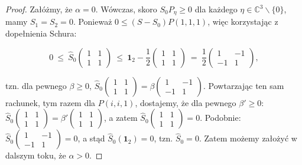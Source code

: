 {\begin{proof}
Załóżmy, że $\alpha = 0$.
Wówczas, skoro $S_{0} P_{\eta} \geq 0$ dla każdego
$\eta \in \mathbb{C}^{3}\backslash\{0\}$,
mamy $S_{1} = S_{2} = 0$.
Ponieważ
$0 \leq (S - S_{0}) P(1,1,1)$,
więc korzystając z dopełnienia Schura:
\begin{linenomath*}
 \begin{equation}
0 \: \leq \: \hat{S}_{0} \begin{pmatrix}
    1 & 1 \\ 1 & 1
    \end{pmatrix} \: \leq \:
    \mathbf{1}_{2} - \frac{1}{2} \begin{pmatrix}
                1 & 1 \\ 1 & 1
                \end{pmatrix} \: = \:
    \frac{1}{2}
    \begin{pmatrix}
    1 & -1 \\ -1 & 1
    \end{pmatrix},
 \end{equation}
\end{linenomath*}
tzn. dla pewnego $\beta \geq 0$,
$
\hat{S}_{0} \left( \begin{smallmatrix}
    1 & 1 \\ 1 & 1
    \end{smallmatrix} \right) =
    \beta \left(
    \begin{smallmatrix}
    1 & -1 \\ -1 & 1
    \end{smallmatrix} \right)
$.
Powtarzając ten sam rachunek, tym razem dla $P(i,i,1)$,
dostajemy, że dla pewnego $\beta' \geq 0$:
$
\hat{S}_{0} \left( \begin{smallmatrix}
    1 & 1 \\ 1 & 1
    \end{smallmatrix} \right) =
    \beta' \left(
    \begin{smallmatrix}
    1 & 1 \\ 1 & 1
    \end{smallmatrix} \right)
$,
a zatem
$
\hat{S}_{0} \left( \begin{smallmatrix}
    1 & 1 \\ 1 & 1
    \end{smallmatrix} \right) = 0
$.
Podobnie:
$
\hat{S}_{0} \left( \begin{smallmatrix}
    1 & -1 \\ -1 & 1
    \end{smallmatrix} \right) = 0
$, a stąd
$\hat{S}_{0}(\mathbf{1}_{2}) = 0$, tzn. $\hat{S}_{0} = 0$.
Zatem możemy założyć w dalszym toku, że $\alpha > 0$.


\end{proof}}

